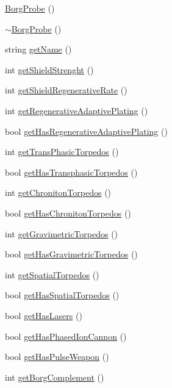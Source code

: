 \begin{DoxyCompactItemize}
\item 
\hyperlink{classBorgProbe_a3af24a2d8ca19a3770f15a1c873709cb}{BorgProbe} ()
\item 
\hyperlink{classBorgProbe_a4d58be5de785e9816f5c9bbda8625951}{$\sim$BorgProbe} ()
\item 
string \hyperlink{classBorgProbe_a93662b939b7b3565c72445f75c56c101}{getName} ()
\item 
int \hyperlink{classBorgProbe_a06fb45579883333083eda36335ef7349}{getShieldStrenght} ()
\item 
int \hyperlink{classBorgProbe_a0bd8db46345776e54af6c198fb4a5c3b}{getShieldRegenerativeRate} ()
\item 
int \hyperlink{classBorgProbe_ab2bd1c4edaae54e53ebec17b4680b11b}{getRegenerativeAdaptivePlating} ()
\item 
bool \hyperlink{classBorgProbe_a5c21dac867e41d71305cce22f6519586}{getHasRegenerativeAdaptivePlating} ()
\item 
int \hyperlink{classBorgProbe_a1879936ef2e6dec0df73dc2628055be7}{getTransPhasicTorpedos} ()
\item 
bool \hyperlink{classBorgProbe_a304d8f8cc7fb8f1d47ab5edf6fe02ba6}{getHasTransphasicTorpedos} ()
\item 
int \hyperlink{classBorgProbe_a4eec0f21a2a68a57498aef50d4d7c544}{getChronitonTorpedos} ()
\item 
bool \hyperlink{classBorgProbe_a6edb033d9ace089d17c1495447e76b1d}{getHasChronitonTorpedos} ()
\item 
int \hyperlink{classBorgProbe_aba5ca1bcf4d4f3f37d80b46bb6b40492}{getGravimetricTorpedos} ()
\item 
bool \hyperlink{classBorgProbe_a882991a84e51a0fd78de0320d4bec53a}{getHasGravimetricTorpedos} ()
\item 
int \hyperlink{classBorgProbe_aaa3c141850bd6d15e6d8eab68d75583c}{getSpatialTorpedos} ()
\item 
bool \hyperlink{classBorgProbe_afefc3c2911ff75c7d02a8fd4390a9bfd}{getHasSpatialTorpedos} ()
\item 
bool \hyperlink{classBorgProbe_a1a77fe640dd80aa9dd6ceb3b8e9555bf}{getHasLasers} ()
\item 
bool \hyperlink{classBorgProbe_a45245995e7fe90e03f64f63c999339b5}{getHasPhasedIonCannon} ()
\item 
bool \hyperlink{classBorgProbe_a60085d6bf6d31b28bfb60eeedca1c711}{getHasPulseWeapon} ()
\item 
int \hyperlink{classBorgProbe_a4a9d5108f208dcaa28b3f182436fd6e1}{getBorgComplement} ()

\end{DoxyCompactItemize}
